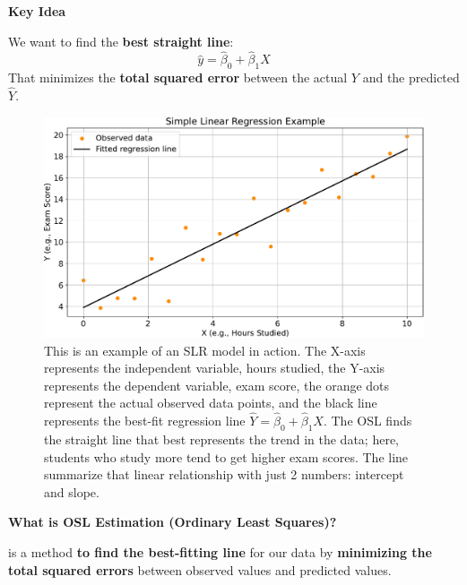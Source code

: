 \highspace
\begin{flushleft}
    \textcolor{Green3}{ \textbf{Key Idea}}
\end{flushleft}
We want to find the \textbf{best straight line}:
\begin{equation*}
    \hat{y} = \hat{\beta}_0 + \hat{\beta}_1 X
\end{equation*}
That minimizes the \textbf{total squared error} between the actual $Y$ and the predicted $\hat{Y}$.

\newpage

\begin{figure}[!htp]
    \centering
    \includegraphics[width=\textwidth]{img/linear-regression/slr.pdf}
    \caption{This is an example of an SLR model in action. The X-axis represents the independent variable, hours studied, the Y-axis represents the dependent variable, exam score, the orange dots represent the actual observed data points, and the black line represents the best-fit regression line $\hat{Y} = \hat{\beta}_{0} + \hat{\beta}_{1} X$. The OSL finds the straight line that best represents the trend in the data; here, students who study more tend to get higher exam scores. The line summarize that linear relationship with just 2 numbers: intercept and slope.}
\end{figure}

\begin{flushleft}
    \textcolor{Green3}{ \textbf{What is OSL Estimation (Ordinary Least Squares)?}}
    \label{def: Ordinary Least Squares Estimation}
\end{flushleft}
 is a method \textbf{to find the best-fitting line} for our data by \textbf{minimizing the total squared errors} between observed values and predicted values.

